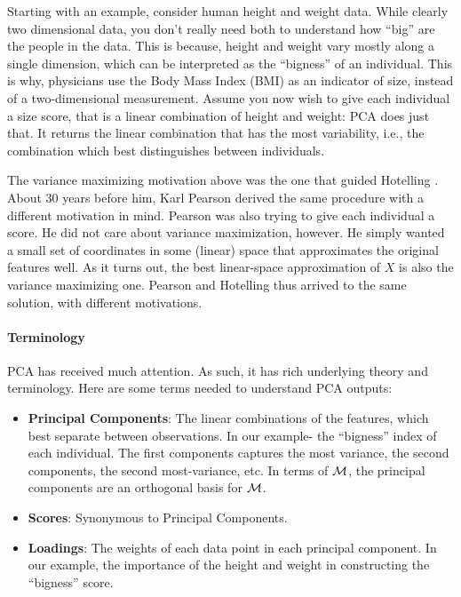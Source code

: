Starting with an example, consider human height and weight data. 
While clearly two dimensional data, you don't really need both to understand how ``big'' are the people in the data. 
This is because, height and weight vary mostly along a single dimension, which can be interpreted as the ``bigness'' of an individual. 
This is why, physicians use the Body Mass Index (BMI) as an indicator of size, instead of a two-dimensional measurement.
Assume you now wish to give each individual a size score, that is a linear combination of height and weight: PCA does just that. It returns the linear combination that has the most variability, i.e., the combination which best distinguishes between individuals. 

The variance maximizing motivation above was the one that guided Hotelling \citep{hotelling_analysis_1933}.
About $30$ years before him, Karl Pearson \citep{pearson_liii._1901} derived the same procedure with a different motivation in mind. Pearson was also trying to give each individual a score. He did not care about variance maximization, however. He simply wanted a small set of coordinates in some (linear) space that approximates the original features well. As it turns out, the best linear-space approximation of $X$ is also the variance maximizing one. Pearson and Hotelling thus arrived to the same solution, with different motivations. 





\paragraph{Terminology}
PCA has received much attention. As such, it has rich underlying theory and terminology.
Here are some terms needed to understand PCA outputs:
\begin{itemize}
\item \textbf{Principal Components}:  The linear combinations of the features, which best separate between observations. In our example- the ``bigness'' index of each individual. The first components captures the most variance, the second components, the second most-variance, etc. In terms of $\mathcal{M}$, the principal components are an orthogonal basis for $\mathcal{M}$.
\item \textbf{Scores}: Synonymous to Principal Components.
\item \textbf{Loadings}: The weights of each data point in each principal component. In our example, the importance of the height and weight in constructing the ``bigness'' score.
\end{itemize}


